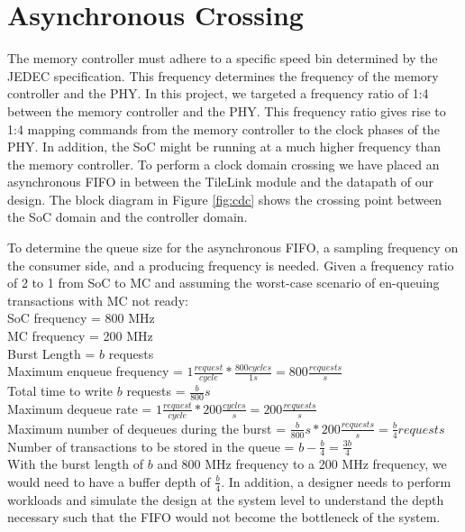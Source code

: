 \section{Asynchronous Crossing}
The memory controller must adhere to a specific speed bin determined by the JEDEC specification. This frequency determines the frequency of the memory controller and the PHY. In this project, we targeted a frequency ratio of 1:4 between the memory controller and the PHY. This frequency ratio gives rise to 1:4 mapping commands from the memory controller to the clock phases of the PHY. In addition, the SoC might be running at a much higher frequency than the memory controller. To perform a clock domain crossing we have placed an asynchronous FIFO in between the TileLink module and the datapath of our design. The block diagram in Figure \ref{fig:cdc} shows the crossing point between the SoC domain and the controller domain. 

To determine the queue size for the asynchronous FIFO, a sampling frequency on the consumer side, and a producing frequency is needed. Given a frequency ratio of 2 to 1 from SoC to MC and assuming the worst-case scenario of en-queuing transactions with MC not ready:\\
    \indent SoC frequency = 800 MHz \\
    \indent MC frequency = 200 MHz \\
    \indent Burst Length = $b$ requests\\
    \indent Maximum enqueue frequency = $1 \frac{request}{cycle} * \frac{800 cycles}{1 s} = 800 \frac{requests}{s}$\\
    \indent Total time to write $b$ requests = $\frac{b}{800} s$\\
    \indent Maximum dequeue rate = $1 \frac{request}{cycle} * 200 \frac{cycles}{s} = 200 \frac{requests}{s}$\\
    \indent Maximum number of dequeues during the burst = $\frac{b}{800} s * 200 \frac{requests}{s} = \frac{b}{4} requests$\\
    \indent Number of transactions to be stored in the queue = $b - \frac{b}{4} = \frac{3b}{4}$\\
    
With the burst length of $b$ and 800 MHz frequency to a 200 MHz frequency, we would need to have a buffer depth of $\frac{b}{4}$. In addition, a designer needs to perform workloads and simulate the design at the system level to understand the depth necessary such that the FIFO would not become the bottleneck of the system.

